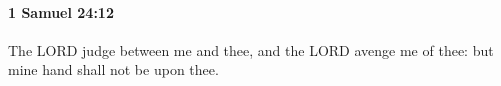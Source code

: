 
		\paragraph{1 Samuel 24:12} %
			\label{1SAMUEL-24-12}

			The LORD judge between me and thee, and the LORD avenge me of thee: but mine hand shall not be upon thee.


